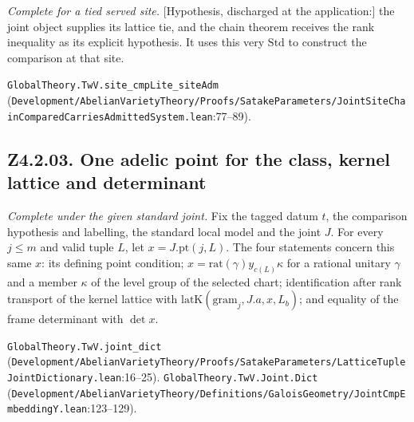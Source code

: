\emph{Complete for a tied served site.} [Hypothesis, discharged at the application:] the joint object supplies its lattice tie, and the chain theorem receives the rank inequality as its explicit hypothesis. It uses this very $\mathrm{Std}$ to construct the comparison at that site.

{\footnotesize \nolinkurl{GlobalTheory.TwV.site_cmpLite_siteAdm} (\nolinkurl{Development/AbelianVarietyTheory/Proofs/SatakeParameters/JointSiteChainComparedCarriesAdmittedSystem.lean}\allowbreak:77--89).}

\subsection{Z4.2.03. One adelic point for the class, kernel lattice and determinant}
\label{r5:small:Z4.2.03}
\textit{Complete under the given standard joint.} Fix the tagged datum $t$, the comparison hypothesis and labelling, the standard local model and the joint $J$. For every $j\le m$ and valid tuple $L$, let $x=J.\mathrm{pt}(j,L)$. The four statements concern this same $x$: its defining point condition; $x=\mathrm{rat}(\gamma)y_{c(L)}\kappa$ for a rational unitary $\gamma$ and a member $\kappa$ of the level group of the selected chart; identification after rank transport of the kernel lattice with $\mathrm{latK}(\mathrm{gram}_j,J.a,x,L_b)$; and equality of the frame determinant with $\det x$.
\par{\footnotesize \nolinkurl{GlobalTheory.TwV.joint_dict} (\nolinkurl{Development/AbelianVarietyTheory/Proofs/SatakeParameters/LatticeTupleJointDictionary.lean}\allowbreak:16--25). \nolinkurl{GlobalTheory.TwV.Joint.Dict} (\nolinkurl{Development/AbelianVarietyTheory/Definitions/GaloisGeometry/JointCmpEmbeddingY.lean}\allowbreak:123--129).\par}

